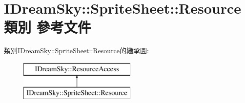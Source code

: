 \hypertarget{class_i_dream_sky_1_1_sprite_sheet_1_1_resource}{}\section{I\+Dream\+Sky\+:\+:Sprite\+Sheet\+:\+:Resource 類別 參考文件}
\label{class_i_dream_sky_1_1_sprite_sheet_1_1_resource}
類別\+I\+Dream\+Sky\+:\+:Sprite\+Sheet\+:\+:Resource的繼承圖\+:\begin{figure}[H]
\begin{center}
\leavevmode
\includegraphics[height=2.000000cm]{class_i_dream_sky_1_1_sprite_sheet_1_1_resource}
\end{center}
\end{figure}
